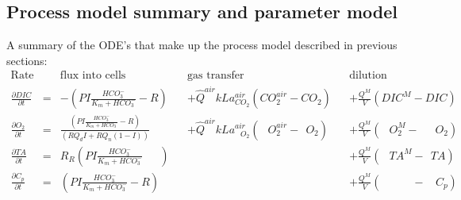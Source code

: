 \documentclass{ruthesis}
\begin{document}
\subsection{Process model summary and parameter model}\label{sec:micro_process_model}

A summary of the ODE's that make up the process model described in previous sections:
\begin{align}
\text{Rate} & & \text{flux into cells}            &            &\text{gas transfer}   &     & \text{dilution} \nonumber                              \\
\frac{\partial DIC}{\partial t}&=&                      - (P I \frac{HCO_3^-}{K_m + HCO_3^-} - R)&      &+\hat Q^{air}kLa_{ CO_2}^{air}(CO_{2}^{air} - CO_{2})                  & &+\frac{Q^M}{V}(DIC^{M} - DIC)       \nonumber \\
\frac{\partial O_2}{\partial t}&=& \frac{(P I \frac{HCO_3^-}{K_m + HCO_3^-} - R)}{(RQ_d I + RQ_n(1-I))}  &      &+\hat Q^{air}kLa_{\phantom{C}O_2}^{air}(\phantom{C}O_{2}^{air} - \phantom{I}O_{2}) && +\frac{Q^M}{V}(\phantom{C}O_{2}^{M} - \phantom{CC}O_{2})     \nonumber   \\
\frac{\partial TA}{\partial t} & =&      R_R (P I \frac{HCO_3^-}{K_m + HCO_3^-} \phantom{ + R})& & & & +\frac{Q^M}{V}(\phantom{C}TA^{M} - \phantom{I}TA) \nonumber\\
\frac{\partial C_p}{\partial t} & =& (P I \frac{HCO_3^-}{K_m + HCO_3^-} - R)&  & & & +\frac{Q^M}{V}(\phantom{CTA^{M}} - \phantom{II}C_p) 
\end{align}
\end{document}

